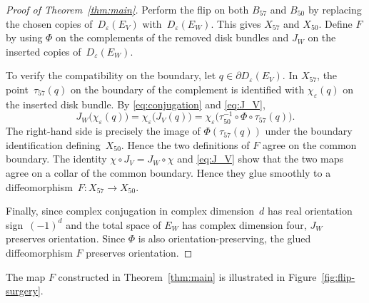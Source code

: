\documentclass{amsart}
\numberwithin{equation}{section}
\theoremstyle{definition}
\begin{document}
\begin{proof}[Proof of Theorem~\ref{thm:main}]
    Perform the flip on both $B_{57}$ and $B_{50}$ by replacing the chosen copies of~$D_\varepsilon(E_V)$ with~$D_\varepsilon(E_W)$. 
    This gives $X_{57}$ and $X_{50}$. 
    Define $F$ by using $\Phi$ on the complements of the removed disk bundles and $J_W$ on the inserted copies of~$D_\varepsilon(E_W)$.
    
    To verify the compatibility on the boundary, let $q\in\partial D_\varepsilon(E_V)$. 
    In $X_{57}$, the point~$\tau_{57}(q)$ on the boundary of the complement is identified with $\chi_\varepsilon(q)$ on the inserted disk bundle. By
    \eqref{eq:conjugation} and \eqref{eq:J_V},
    $$
        J_W\bigl(\chi_\varepsilon(q)\bigr)=\chi_\varepsilon\bigl(J_V(q)\bigr)=\chi_\varepsilon\bigl( \tau_{50}^{-1}\circ\Phi\circ\tau_{57}(q) \bigr).
    $$
    The right-hand side is precisely the image of $\Phi(\tau_{57}(q))$ under the boundary identification defining~$X_{50}$. 
    Hence the two definitions of $F$ agree on the common boundary.
    The identity $\chi\circ J_V=J_W\circ\chi$ and \eqref{eq:J_V} show that the two maps agree on a collar of the common boundary. 
    Hence they glue smoothly to a diffeomorphism~$F\colon X_{57}\to X_{50}$.

    Finally, since complex conjugation in complex dimension~$d$ has real orientation sign~$(-1)^d$ and the total space of $E_W$ has complex dimension four, $J_W$ preserves orientation. 
    Since $\Phi$ is also orientation-preserving, the glued diffeomorphism $F$ preserves orientation.
\end{proof}
The map $F$ constructed in Theorem~\ref{thm:main} is illustrated in Figure~\ref{fig:flip-surgery}.
\end{document}
